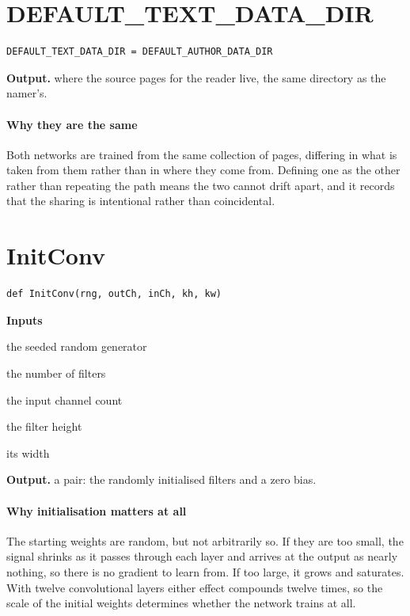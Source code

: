 \section{DEFAULT\_TEXT\_DATA\_DIR}
\begin{lstlisting}[style=sig]
DEFAULT_TEXT_DATA_DIR = DEFAULT_AUTHOR_DATA_DIR
\end{lstlisting}

\noindent\textbf{Output.} where the source pages for the reader live, the same directory as the namer's.


\paragraph{Why they are the same}
Both networks are trained from the same collection of pages, differing in what is taken from them rather than in where they come from. Defining one as the other rather than repeating the path means the two cannot drift apart, and it records that the sharing is intentional rather than coincidental.


\section{InitConv}
\begin{lstlisting}[style=sig]
def InitConv(rng, outCh, inCh, kh, kw)
\end{lstlisting}

\noindent\textbf{Inputs}
\begin{description}[leftmargin=2.2em,style=nextline,font=\normalfont\ttfamily]\setlength\itemsep{1pt}
  \item[{rng}] \normalfont the seeded random generator
  \item[{outCh}] \normalfont the number of filters
  \item[{inCh}] \normalfont the input channel count
  \item[{kh}] \normalfont the filter height
  \item[{kw}] \normalfont its width
\end{description}

\noindent\textbf{Output.} a pair: the randomly initialised filters and a zero bias.


\paragraph{Why initialisation matters at all}
The starting weights are random, but not arbitrarily so. If they are too small, the signal shrinks as it passes through each layer and arrives at the output as nearly nothing, so there is no gradient to learn from. If too large, it grows and saturates. With twelve convolutional layers either effect compounds twelve times, so the scale of the initial weights determines whether the network trains at all.



